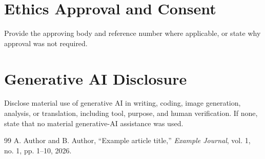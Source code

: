 \documentclass[11pt,a4paper]{article}
\begin{document}
\section*{Ethics Approval and Consent}
Provide the approving body and reference number where applicable, or state why approval was not required.

\section*{Generative AI Disclosure}
Disclose material use of generative AI in writing, coding, image generation, analysis, or translation, including tool, purpose, and human verification. If none, state that no material generative-AI assistance was used.

\begin{thebibliography}{99}
A. Author and B. Author, ``Example article title,'' \textit{Example Journal}, vol. 1, no. 1, pp. 1--10, 2026.
\end{thebibliography}
\end{document}
